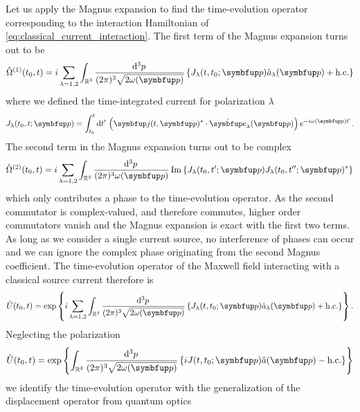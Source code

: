 Let us apply the Magnus expansion to find the time-evolution operator corresponding to the interaction Hamiltonian of \cref{eq:classical_current_interaction}.
The first term of the Magnus expansion turns out to be
\begin{equation}
	\hat{\Omega}^{(1)}(t_0,t)
	=
	i
	\sum_{\lambda=1,2}
	\int_{\mathbb{R}^3}\frac{\dd[3]{p}}{(2\pi)^3\sqrt{2\omega(\vb{p})}}
	\left\{
		J_\lambda(t,t_0;\vb{p})
		\hat{a}_\lambda(\vb{p})
		+
		\text{h.c.}
	\right\}
\end{equation}
where we defined the time-integrated current for polarization $\lambda$
\begin{equation}
	J_\lambda(t_0,t;\vb{p})
	=
	\int_{t_0}^t\dd{t^\prime}
	\left(
		\vb{j}(t,\vb{p})^*
		\vdot
		\vu{e}_\lambda(\vb{p})
	\right)
	e^{-i\omega(\vb{p})t^\prime}
	.
\end{equation}
The second term in the Magnus expansion turns out to be complex
\begin{equation}
	\hat{\Omega}^{(2)}(t_0,t)
	=
	i\sum_{\lambda=1,2}
	\int_{\mathbb{R}^3}\frac{\dd[3]{p}}{(2\pi)^3\omega(\vb{p})}
	\Im\left\{
		J_\lambda(t_0,t^\prime;\vb{p})
		J_\lambda(t_0,t^{\prime\prime};\vb{p})^*
	\right\}
\end{equation}
which only contributes a phase to the time-evolution operator.
As the second commutator is complex-valued, and therefore commutes, higher order commutators vanish and the Magnus expansion is exact with the first two terms.
As long as we consider a single current source, no interference of phases can occur and we can ignore the complex phase originating from the second Magnus coefficient.
The time-evolution operator of the Maxwell field interacting with a classical source current therefore is~\cite[p.~168]{Itzykson2012}
\begin{equation}
	\hat{U}(t_0,t)
	=
	\exp\left\{
		i\sum_{\lambda=1,2}
		\int_{\mathbb{R}^3}\frac{\dd[3]{p}}{(2\pi) ^3\sqrt{2\omega(\vb{p})}}
		\left\{
			J_\lambda(t,t_0;\vb{p})
			\hat{a}_\lambda(\vb{p})
			+
			\text{h.c.}
		\right\}
	\right\}
	.
\end{equation}
Neglecting the polarization 
\begin{equation}
	\hat{U}(t_0,t)
	=
	\exp\left\{
		\int_{\mathbb{R}^3}\frac{\dd[3]{p}}{(2\pi) ^3\sqrt{2\omega(\vb{p})}}
		\left\{
			i
			J(t,t_0;\vb{p})
			\hat{a}(\vb{p})
			-
			\text{h.c.}
		\right\}
	\right\}
\end{equation}
we identify the time-evolution operator with the generalization of the displacement operator from quantum optics~\cite[p.~47]{Barnett2002}
